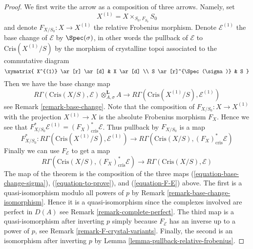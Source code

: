 \begin{proof}
We first write the arrow as a composition of three arrows.
Namely, set
$$
X^{(1)} = X \times_{S_0, F_{S_0}} S_0
$$
and denote $F_{X/S_0} : X \to X^{(1)}$ the relative Frobenius morphism.
Denote $\mathcal{E}^{(1)}$ the base change of $\mathcal{E}$
by $\Spec(\sigma)$, in other words the pullback of $\mathcal{E}$
to $\text{Cris}(X^{(1)}/S)$ by the morphism of crystalline topoi
associated to the commutative diagram
$$
\xymatrix{
X^{(1)} \ar[r] \ar[d] & X \ar[d] \\
S \ar[r]^{\Spec(\sigma)} & S
}
$$
Then we have the base change map
\begin{equation}
\label{equation-base-change-sigma}
R\Gamma(\text{Cris}(X/S), \mathcal{E}) \otimes^\mathbf{L}_{A, \sigma} A
\longrightarrow
R\Gamma(\text{Cris}(X^{(1)}/S), \mathcal{E}^{(1)})
\end{equation}
see Remark \ref{remark-base-change}. Note that the composition
of $F_{X/S_0} : X \to X^{(1)}$ with the projection $X^{(1)} \to X$
is the absolute Frobenius morphism $F_X$. Hence we see that
$F_{X/S_0}^*\mathcal{E}^{(1)} = (F_X)_{\text{cris}}^*\mathcal{E}$.
Thus pullback by $F_{X/S_0}$ is a map
\begin{equation}
\label{equation-to-prove}
F_{X/S_0}^* :
R\Gamma(\text{Cris}(X^{(1)}/S), \mathcal{E}^{(1)})
\longrightarrow
R\Gamma(\text{Cris}(X/S), (F_X)^*_{\text{cris}}\mathcal{E})
\end{equation}
Finally we can use $F_\mathcal{E}$ to get a map
\begin{equation}
\label{equation-F-E}
R\Gamma(\text{Cris}(X/S), (F_X)^*_{\text{cris}}\mathcal{E})
\longrightarrow
R\Gamma(\text{Cris}(X/S), \mathcal{E})
\end{equation}
The map of the theorem is the composition of the three maps
(\ref{equation-base-change-sigma}), (\ref{equation-to-prove}), and
(\ref{equation-F-E}) above. The first is a
quasi-isomorphism modulo all powers of $p$ by
Remark \ref{remark-base-change-isomorphism}.
Hence it is a quasi-isomorphism since the complexes involved are perfect
in $D(A)$ see Remark \ref{remark-complete-perfect}.
The third map is a quasi-isomorphism after inverting $p$ simply
because $F_\mathcal{E}$ has an inverse up to a power of $p$, see
Remark \ref{remark-F-crystal-variants}.
Finally, the second is an isomorphism after inverting $p$
by Lemma \ref{lemma-pullback-relative-frobenius}.
\end{proof}












